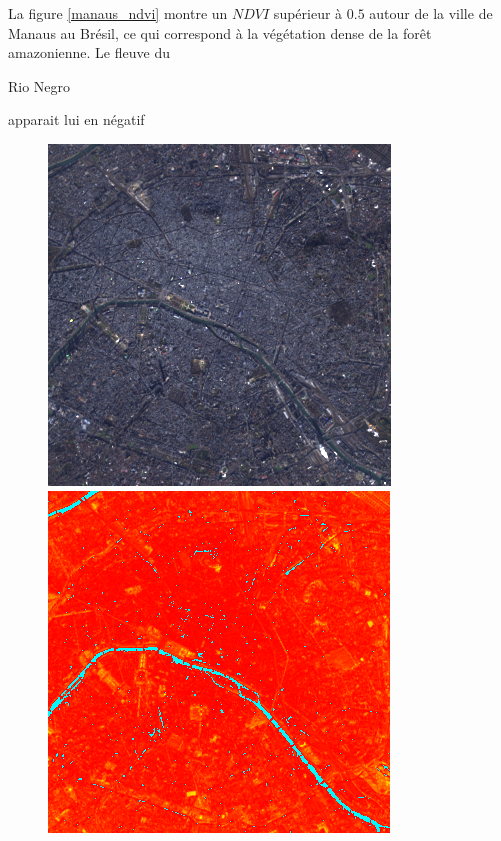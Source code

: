 \documentclass{book}
\begin{document}
La figure \ref{manaus_ndvi} montre un $NDVI$ supérieur à $0.5$ autour de la ville de Manaus au Brésil, ce qui correspond à la végétation dense de la for\^et amazonienne. Le fleuve
du \begin{itshape}Rio Negro\end{itshape} apparait lui en négatif\\

\clearpage

\begin{figure}[H]
\centerline{
\includegraphics[scale=0.45]{images/Paris/12_rgb.png}
\includegraphics[scale=0.45]{images/Paris/12_ndvi.png}
}
\end{figure}
\end{document}
